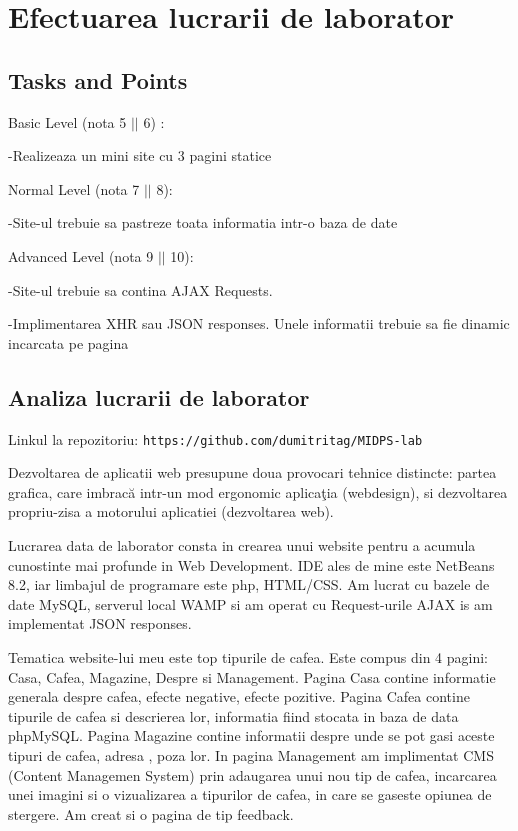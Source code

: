 
\section{Efectuarea lucrarii de laborator}



\subsection{Tasks and Points}



 Basic Level (nota 5 $||$ 6) : 

-Realizeaza un mini site cu 3 pagini statice


Normal Level (nota 7 $||$ 8):
 
-Site-ul trebuie sa pastreze toata informatia intr-o baza de date


Advanced Level (nota 9 $||$ 10):

-Site-ul trebuie sa contina AJAX Requests.

-Implimentarea XHR sau JSON responses. Unele informatii trebuie sa fie dinamic incarcata pe pagina



\subsection{Analiza lucrarii de laborator}


Linkul la repozitoriu: \texttt{https://github.com/dumitritag/MIDPS-lab}


Dezvoltarea de aplicatii web presupune doua provocari tehnice distincte: partea grafica, care imbracă intr-un mod ergonomic aplicaţia (webdesign), si dezvoltarea propriu-zisa a motorului aplicatiei (dezvoltarea web).

Lucrarea data de laborator consta in crearea unui website pentru a acumula cunostinte mai profunde in Web Development. IDE ales de mine este NetBeans 8.2, iar limbajul de programare este php, HTML/CSS. Am lucrat cu bazele de date MySQL, serverul local WAMP si am operat cu Request-urile AJAX is am implementat JSON responses. 

Tematica website-lui meu este top tipurile de cafea. Este compus din 4 pagini: Casa, Cafea, Magazine, Despre si Management. Pagina Casa contine informatie generala despre cafea, efecte negative, efecte pozitive. Pagina Cafea contine tipurile de cafea si descrierea lor, informatia fiind stocata in baza de data phpMySQL. Pagina Magazine contine informatii despre unde se pot gasi aceste tipuri de cafea, adresa , poza lor. In pagina Management am implimentat CMS (Content Managemen System) prin adaugarea unui nou tip de cafea, incarcarea unei imagini si o vizualizarea a tipurilor de cafea, in care se gaseste opiunea de stergere. Am creat si o pagina de tip feedback.



